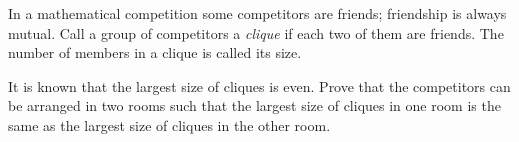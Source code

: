 In a mathematical competition some competitors are friends; friendship is always mutual. Call a group of competitors a \emph{clique} if each two of them are friends. The number of members in a clique is called its size.

It is known that the largest size of cliques is even. Prove that the competitors can be arranged in two rooms such that the largest size of cliques in one room is the same as the largest size of cliques in the other room.
